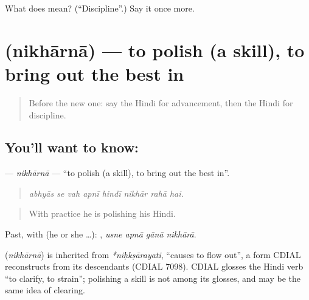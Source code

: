 \begin{tcolorbox}[breakable,colback=teal!4,colframe=teal!35!black,title={Before you move on}]
What does  mean? (\textquotedblleft{}Discipline\textquotedblright{}.) Say it once more.
\end{tcolorbox}
\section[\texorpdfstring{\hi{निखारना} (nikhārnā)}{निखारना (nikhārnā)}]{ (nikhārnā) — to polish (a skill), to bring out the best in}

\label{lesson:HI-C368-nikhaarna}



\begin{quote}
Before the new one: say the Hindi for advancement, then the Hindi for discipline.
\end{quote}

\subsection*{You'll want to know: }
\textbf{} — \emph{nikhārnā} — \textquotedblleft{}to polish (a skill), to bring out the best in\textquotedblright{}.

\begin{quote}
       
\end{quote}

\begin{quote}
\emph{abhyās se vah apnī hindī nikhār rahā hai.}
\end{quote}

\begin{quote}
With practice he is polishing his Hindi.
\end{quote}

Past, with  (he or she …):    , \emph{usne apnā gānā nikhārā}.

\begin{cousinweb}
\textbf{} (\emph{nikhārnā}) is inherited from \emph{*niḥkṣārayati}, \textquotedblleft{}causes to flow out\textquotedblright{}, a form CDIAL reconstructs from its descendants (CDIAL 7098). CDIAL glosses the Hindi verb \textquotedblleft{}to clarify, to strain\textquotedblright{}; polishing a skill is not among its glosses, and may be the same idea of clearing.
\end{cousinweb}

